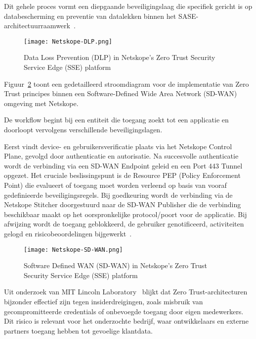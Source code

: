 Dit gehele proces vormt een diepgaande beveiligingslaag die specifiek gericht is op databescherming en preventie van datalekken binnen het SASE-architectuurraamwerk~\autocite{Netskope2024}.
\begin{figure}[H]
  \centering
  \texttt{[image: Netskope-DLP.png]}
  \caption[Netskope Data Loss Prevention (DLP)]{Data Loss Prevention (DLP) in Netskope's Zero Trust Security Service Edge (SSE) platform~\autocite{Netskope2024}}
  \label{fig:Netskope-DLP}
\end{figure}

Figuur~\ref{fig:Netskope-SD-WAN} toont een gedetailleerd stroomdiagram voor de implementatie van Zero Trust principes binnen een Software-Defined Wide Area Network (SD-WAN) omgeving met Netskope. 

\vspace{2ex}

De workflow begint bij een entiteit die toegang zoekt tot een applicatie en doorloopt vervolgens verschillende beveiligingslagen. 

\vspace{2ex}

Eerst vindt device- en gebruikersverificatie plaats via het Netskope Control Plane, gevolgd door authenticatie en autorisatie. Na succesvolle authenticatie wordt de verbinding via een SD-WAN Endpoint geleid en een Port 443 Tunnel opgezet. Het cruciale beslissingspunt is de Resource PEP (Policy Enforcement Point) die evalueert of toegang moet worden verleend op basis van vooraf gedefinieerde beveiligingsregels. Bij goedkeuring wordt de verbinding via de Netskope Stitcher doorgestuurd naar de SD-WAN Publisher die de verbinding beschikbaar maakt op het oorspronkelijke protocol/poort voor de applicatie. Bij afwijzing wordt de toegang geblokkeerd, de gebruiker genotificeerd, activiteiten gelogd en risicobeoordelingen bijgewerkt~\autocite{Netskope2024}.
\begin{figure}[H]
  \centering
  \texttt{[image: Netskope-SD-WAN.png]}
  \caption[Netskope Software Defined WAN (SD-WAN)]{Software Defined WAN (SD-WAN) in Netskope's Zero Trust Security Service Edge (SSE) platform~\autocite{Netskope2024}}
  \label{fig:Netskope-SD-WAN}
\end{figure}

\vspace{2ex}

Uit onderzoek van MIT Lincoln Laboratory~\autocite{MIT2022} blijkt dat Zero Trust-architecturen bijzonder effectief zijn tegen insiderdreigingen, zoals misbruik van gecompromitteerde credentials of onbevoegde toegang door eigen medewerkers. 
Dit risico is relevant voor het onderzochte bedrijf, waar ontwikkelaars en externe partners toegang hebben tot gevoelige klantdata. 

